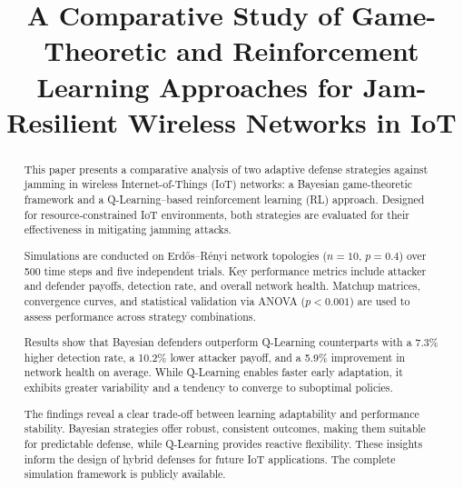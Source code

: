 \documentclass[conference]{IEEEtran}
\begin{document}
\title{A Comparative Study of Game-Theoretic and Reinforcement Learning Approaches for Jam-Resilient Wireless Networks in IoT}

\author{
  \and
  \and
}

\maketitle

\begin{abstract}
This paper presents a comparative analysis of two adaptive defense strategies against jamming in wireless Internet-of-Things (IoT) networks: a Bayesian game-theoretic framework and a Q-Learning–based reinforcement learning (RL) approach. Designed for resource-constrained IoT environments, both strategies are evaluated for their effectiveness in mitigating jamming attacks.

Simulations are conducted on Erd\H{o}s–R\'enyi network topologies ($n = 10$, $p = 0.4$) over 500 time steps and five independent trials. Key performance metrics include attacker and defender payoffs, detection rate, and overall network health. Matchup matrices, convergence curves, and statistical validation via ANOVA ($p < 0.001$) are used to assess performance across strategy combinations.

Results show that Bayesian defenders outperform Q-Learning counterparts with a 7.3\% higher detection rate, a 10.2\% lower attacker payoff, and a 5.9\% improvement in network health on average. While Q-Learning enables faster early adaptation, it exhibits greater variability and a tendency to converge to suboptimal policies.

The findings reveal a clear trade-off between learning adaptability and performance stability. Bayesian strategies offer robust, consistent outcomes, making them suitable for predictable defense, while Q-Learning provides reactive flexibility. These insights inform the design of hybrid defenses for future IoT applications. The complete simulation framework is publicly available.
\end{abstract}
\end{document}
